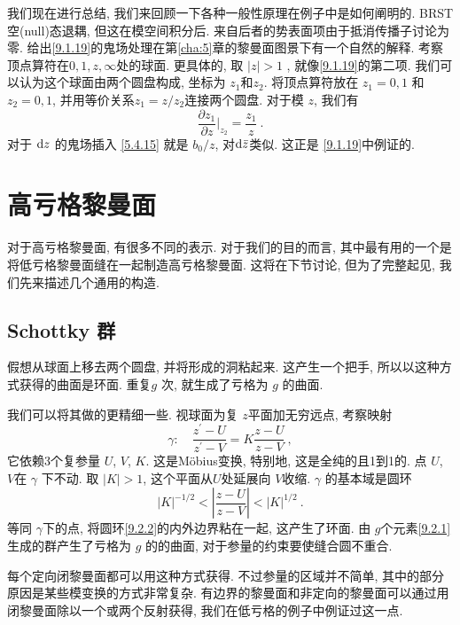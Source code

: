 我们现在进行总结, 我们来回顾一下各种一般性原理在例子中是如何阐明的. BRST空(null)态退耦, 但这在模空间积分后. 
来自后者的势表面项由于抵消传播子讨论为零. 给出\eqref{9.1.19}的鬼场处理在第\ref{cha:5}章的黎曼面图景下有一个自然的解释. 
考察顶点算符在$0,1, z, \infty $处的球面. 更具体的, 取 $|z|>1$ , 就像\eqref{9.1.19}的第二项. 我们可以认为这个球面由两个圆盘构成, 
坐标为 $z_{1}$和$z_{2}$. 将顶点算符放在 $z_{1}=0,1$ 和 $z_{2}=0,1$, 并用等价关系$z_{1}=z / z_{2}$连接两个圆盘. 对于模 $z$, 我们有
\begin{equation}
	\frac{\partial z_{1}}{\partial z}\biggr|_{z_{2}}=\frac{z_{1}}{z} \:. \label{9.1.34}
\end{equation}
对于 $\mathrm{d} z$ 的鬼场插入 \eqref{5.4.15} 就是 $b_{0} / z$, 对$\mathrm{d} \bar{z}$类似. 这正是 \eqref{9.1.19}中例证的.


\section{高亏格黎曼面} \label{sec:9.2}%

对于高亏格黎曼面, 有很多不同的表示. 对于我们的目的而言, 其中最有用的一个是将低亏格黎曼面缝在一起制造高亏格黎曼面. 
这将在下节讨论, 但为了完整起见, 我们先来描述几个通用的构造.

\subsection*{Schottky 群}

假想从球面上移去两个圆盘, 并将形成的洞粘起来. 这产生一个把手, 所以以这种方式获得的曲面是环面. 重复$g$ 次, 就生成了亏格为 $g$ 的曲面.

我们可以将其做的更精细一些. 视球面为复 $z$平面加无穷远点, 考察映射
\begin{equation}
	\gamma: \quad \frac{z^{\prime}-U}{z^{\prime}-V}=K \frac{z-U}{z-V} \:, \label{9.2.1}
\end{equation}
它依赖3个复参量 $U$, $V$, $K$. 这是Möbius变换, 特别地, 这是全纯的且1到1的. 点 $U$, $V$在 $\gamma $ 下不动. 
取 $|K|>1$, 这个平面从$U$处延展向 $V$收缩.  $\gamma$ 的基本域是圆环
\begin{equation}
	|K|^{-1/2} < \left|\frac{z-U}{z-V}\right| < |K|^{1/2} \:. \label{9.2.2}
\end{equation}
等同 $\gamma$下的点, 将圆环\eqref{9.2.2}的内外边界粘在一起, 这产生了环面. 由 $g$个元素\eqref{9.2.1}生成的群产生了亏格为 $g$ 的的曲面, 
对于参量的约束要使缝合圆不重合.

每个定向闭黎曼面都可以用这种方式获得. 不过参量的区域并不简单, 其中的部分原因是某些模变换的方式非常复杂. 
有边界的黎曼面和非定向的黎曼面可以通过用闭黎曼面除以一个或两个反射获得, 我们在低亏格的例子中例证过这一点.

